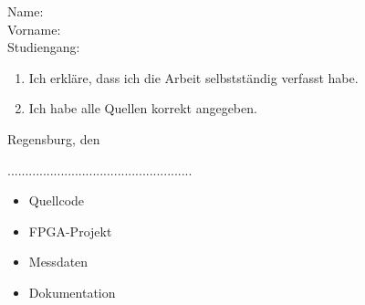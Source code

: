 \documentclass[12pt,a4paper,bibliography=totoc,listof=totoc]{scrartcl}
\begin{document}


\vspace{3em}

Name:\\
Vorname:\\
Studiengang:\\

\vspace{4em}

\begin{enumerate}
\setlength\itemsep{2em}
\item Ich erkläre, dass ich die Arbeit selbstständig verfasst habe.
\item Ich habe alle Quellen korrekt angegeben.
\end{enumerate}

\vspace{4em}

Regensburg, den

\vspace{2em}
....................................................

\pagebreak


\renewcommand\refname{Literaturverzeichnis}



\pagebreak



\begin{itemize}
\item Quellcode
\item FPGA-Projekt
\item Messdaten
\item Dokumentation
\end{itemize}
\end{document}
